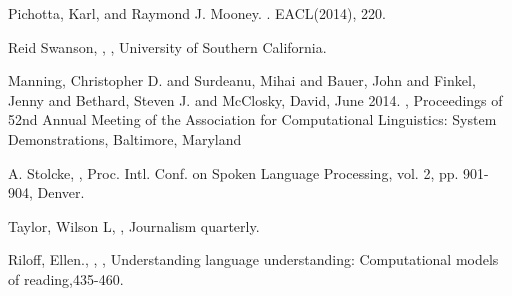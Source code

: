 \documentclass[12pt]{article}
\begin{document}
\begin{thebibliography}{}
	Pichotta, Karl, and Raymond J. Mooney.
	.
	 \newblock EACL(2014), 220.
	  
  	Reid Swanson,
  	,
  	, 
  	\newblock University of Southern California.
  
	Manning, Christopher D. and  Surdeanu, Mihai  and  Bauer, John  and  Finkel, Jenny  and  Bethard, Steven J. and  McClosky, David,
	\newblock June 2014.
	,
	\newblock Proceedings of 52nd Annual Meeting of the Association for Computational Linguistics: System Demonstrations,
	\newblock Baltimore, Maryland

	A. Stolcke,
	,
	\newblock Proc. Intl. Conf. on Spoken Language Processing,
	\newblock vol. 2, pp. 901-904, Denver.

Taylor, Wilson L,
,
\newblock Journalism quarterly.

Riloff, Ellen.,
,
,
\newblock Understanding language understanding: Computational models of reading,435-460.


\end{thebibliography}
\end{document}

